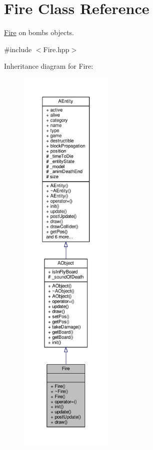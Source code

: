 \hypertarget{class_fire}{}\section{Fire Class Reference}
\label{class_fire}


\hyperlink{class_fire}{Fire} on bombs objects.  




{\ttfamily \#include $<$Fire.\+hpp$>$}



Inheritance diagram for Fire\+:
\nopagebreak
\begin{figure}[H]
\begin{center}
\leavevmode
\includegraphics[height=550pt]{class_fire__inherit__graph}
\end{center}
\end{figure}


